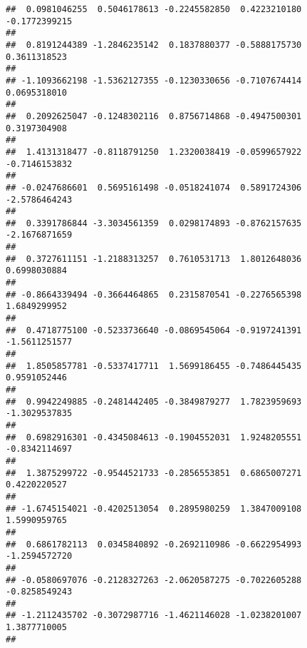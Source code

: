 \documentclass[]{article}
\begin{document}
\begin{verbatim}
##  0.0981046255  0.5046178613 -0.2245582850  0.4223210180 -0.1772399215 
##                                                                       
##  0.8191244389 -1.2846235142  0.1837880377 -0.5888175730  0.3611318523 
##                                                                       
## -1.1093662198 -1.5362127355 -0.1230330656 -0.7107674414  0.0695318010 
##                                                                       
##  0.2092625047 -0.1248302116  0.8756714868 -0.4947500301  0.3197304908 
##                                                                       
##  1.4131318477 -0.8118791250  1.2320038419 -0.0599657922 -0.7146153832 
##                                                                       
## -0.0247686601  0.5695161498 -0.0518241074  0.5891724306 -2.5786464243 
##                                                                       
##  0.3391786844 -3.3034561359  0.0298174893 -0.8762157635 -2.1676871659 
##                                                                       
##  0.3727611151 -1.2188313257  0.7610531713  1.8012648036  0.6998030884 
##                                                                       
## -0.8664339494 -0.3664464865  0.2315870541 -0.2276565398  1.6849299952 
##                                                                       
##  0.4718775100 -0.5233736640 -0.0869545064 -0.9197241391 -1.5611251577 
##                                                                       
##  1.8505857781 -0.5337417711  1.5699186455 -0.7486445435  0.9591052446 
##                                                                       
##  0.9942249885 -0.2481442405 -0.3849879277  1.7823959693 -1.3029537835 
##                                                                       
##  0.6982916301 -0.4345084613 -0.1904552031  1.9248205551 -0.8342114697 
##                                                                       
##  1.3875299722 -0.9544521733 -0.2856553851  0.6865007271  0.4220220527 
##                                                                       
## -1.6745154021 -0.4202513054  0.2895980259  1.3847009108  1.5990959765 
##                                                                       
##  0.6861782113  0.0345840892 -0.2692110986 -0.6622954993 -1.2594572720 
##                                                                       
## -0.0580697076 -0.2128327263 -2.0620587275 -0.7022605288 -0.8258549243 
##                                                                       
## -1.2112435702 -0.3072987716 -1.4621146028 -1.0238201007  1.3877710005 
##                                                                       

\end{verbatim}
\end{document}

